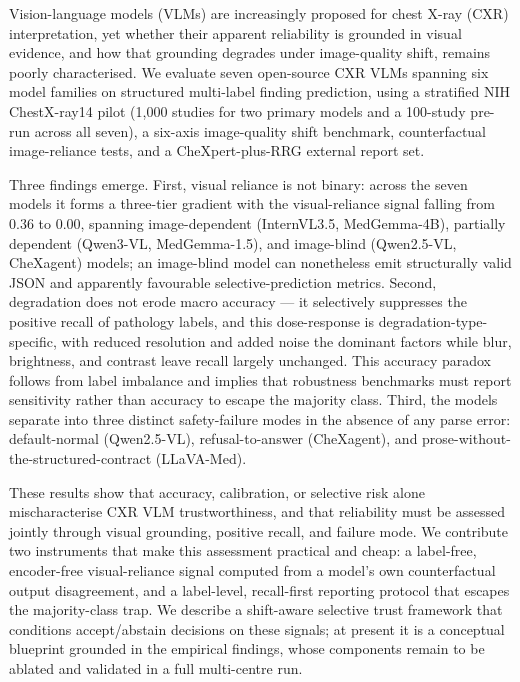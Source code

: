 Vision-language models (VLMs) are increasingly proposed for chest X-ray (CXR) interpretation, yet whether their apparent reliability is grounded in visual evidence, and how that grounding degrades under image-quality shift, remains poorly characterised. We evaluate seven open-source CXR VLMs spanning six model families on structured multi-label finding prediction, using a stratified NIH ChestX-ray14 pilot (1,000 studies for two primary models and a 100-study pre-run across all seven), a six-axis image-quality shift benchmark, counterfactual image-reliance tests, and a CheXpert-plus-RRG external report set.

Three findings emerge. First, visual reliance is not binary: across the seven models it forms a three-tier gradient with the visual-reliance signal falling from 0.36 to 0.00, spanning image-dependent (InternVL3.5, MedGemma-4B), partially dependent (Qwen3-VL, MedGemma-1.5), and image-blind (Qwen2.5-VL, CheXagent) models; an image-blind model can nonetheless emit structurally valid JSON and apparently favourable selective-prediction metrics. Second, degradation does not erode macro accuracy --- it selectively suppresses the positive recall of pathology labels, and this dose-response is degradation-type-specific, with reduced resolution and added noise the dominant factors while blur, brightness, and contrast leave recall largely unchanged. This accuracy paradox follows from label imbalance and implies that robustness benchmarks must report sensitivity rather than accuracy to escape the majority class. Third, the models separate into three distinct safety-failure modes in the absence of any parse error: default-normal (Qwen2.5-VL), refusal-to-answer (CheXagent), and prose-without-the-structured-contract (LLaVA-Med).

These results show that accuracy, calibration, or selective risk alone mischaracterise CXR VLM trustworthiness, and that reliability must be assessed jointly through visual grounding, positive recall, and failure mode. We contribute two instruments that make this assessment practical and cheap: a label-free, encoder-free visual-reliance signal computed from a model's own counterfactual output disagreement, and a label-level, recall-first reporting protocol that escapes the majority-class trap. We describe a shift-aware selective trust framework that conditions accept/abstain decisions on these signals; at present it is a conceptual blueprint grounded in the empirical findings, whose components remain to be ablated and validated in a full multi-centre run.